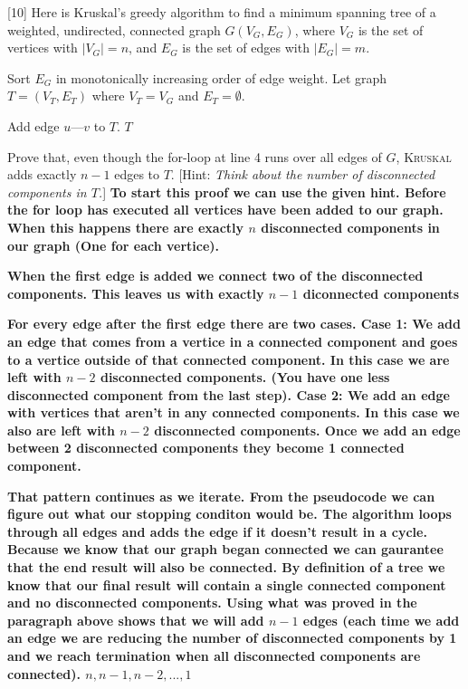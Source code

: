 \documentclass[addpoints]{exam}
\def\mysolution#1{}    %
\begin{document}
\begin{questions}
\mysolution{

}

[10]
Here is Kruskal's greedy algorithm to find a minimum spanning tree of a weighted, undirected, connected graph $G(V_G,E_G)$, where $V_G$ is the set of vertices with $|V_G|=n$, and $E_G$ is the set of edges with $|E_G|=m$.
\begin{algorithmic}[1]
    \State Sort $E_G$ in monotonically increasing order of edge weight.
    \State Let graph $T=(V_T,E_T)$ where $V_T=V_G$ and $E_T=\emptyset$.
    
            \State Add edge $u$---$v$ to $T$.
        \EndIf
    \EndFor
    \State \Return $T$
    \EndFunction
\end{algorithmic}

Prove that, even though the for-loop at line 4 runs over all edges of $G$, \textsc{Kruskal} adds exactly $n-1$ edges to $T$. [Hint: \textit{Think about the number of disconnected components in $T$.}]
\textbf{To start this proof we can use the given hint. Before the for loop has executed all vertices have been added to our graph. When this happens there are exactly $n$ disconnected components in our graph (One for each vertice).}

\textbf{When the first edge is added we connect two of the disconnected components. This leaves us with exactly $n-1$ diconnected components}

\textbf{For every edge after the first edge there are two cases. Case 1: We add an edge that comes from a vertice in a connected component and goes to a vertice outside of that connected component. In this case we are left with $n-2$ disconnected components. (You have one less disconnected component from the last step). Case 2: We add an edge with vertices that aren't in any connected components. In this case we also are left with $n-2$ disconnected components. Once we add an edge between 2 disconnected components they become 1 connected component.}

\textbf{That pattern continues as we iterate. From the pseudocode we can figure out what our stopping conditon would be. The algorithm loops through all edges and adds the edge if it doesn't result in a cycle. Because we know that our graph began connected we can gaurantee that the end result will also be connected. By definition of a tree we know that our final result will contain a single connected component and no disconnected components. Using what was proved in the paragraph above shows that we will add $n-1$ edges (each time we add an edge we are reducing the number of disconnected components by 1 and we reach termination when all disconnected components are connected). $n,n-1,n-2,...,1$}


\end{questions}
\end{document}
